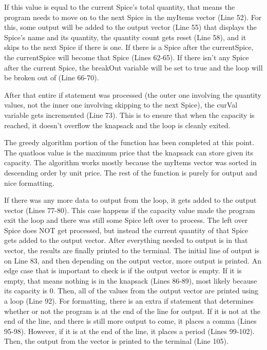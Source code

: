 \documentclass[letterpaper, 10pt]{article}
\begin{document}
\vspace{1em}
\noindent
If this value is equal to the current Spice's total quantity, that means the program needs to move on to the next Spice in the myItems vector (Line 52). For this, some output will be added to the output vector (Line 55) that displays the Spice's name and its quantity, the quantity count gets reset (Line 58), and it skips to the next Spice if there is one. If there is a Spice after the currentSpice, the currentSpice will become that Spice (Lines 62-65). If there isn't any Spice after the current Spice, the breakOut variable will be set to true and the loop will be broken out of (Line 66-70).

\vspace{1em}
\noindent
After that entire if statement was processed (the outer one involving the quantity values, not the inner one involving skipping to the next Spice), the curVal variable gets incremented (Line 73). This is to ensure that when the capacity is reached, it doesn't overflow the knapsack and the loop is cleanly exited. 

\vspace{1em}
\noindent
The greedy algorithm portion of the function has been completed at this point. The quatloos value is the maximum price that the knapsack can store given its capacity. The algorithm works mostly because the myItems vector was sorted in descending order by unit price. The rest of the function is purely for output and nice formatting.

\vspace{1em}
\noindent
If there was any more data to output from the loop, it gets added to the output vector (Lines 77-80). This case happens if the capacity value made the program exit the loop and there was still some Spice left over to process. The left over Spice does NOT get processed, but instead the current quantity of that Spice gets added to the output vector. After everything needed to output is in that vector, the results are finally printed to the terminal. The initial line of output is on Line 83, and then depending on the output vector, more output is printed. An edge case that is important to check is if the output vector is empty. If it is empty, that means nothing is in the knapsack (Lines 86-89), most likely because its capacity is 0. Then, all of the values from the output vector are printed using a loop (Line 92). For formatting, there is an extra if statement that determines whether or not the program is at the end of the line for output. If it is not at the end of the line, and there is still more output to come, it places a comma (Lines 95-98). However, if it is at the end of the line, it places a period (Lines 99-102). Then, the output from the vector is printed to the terminal (Line 105).
\end{document}
